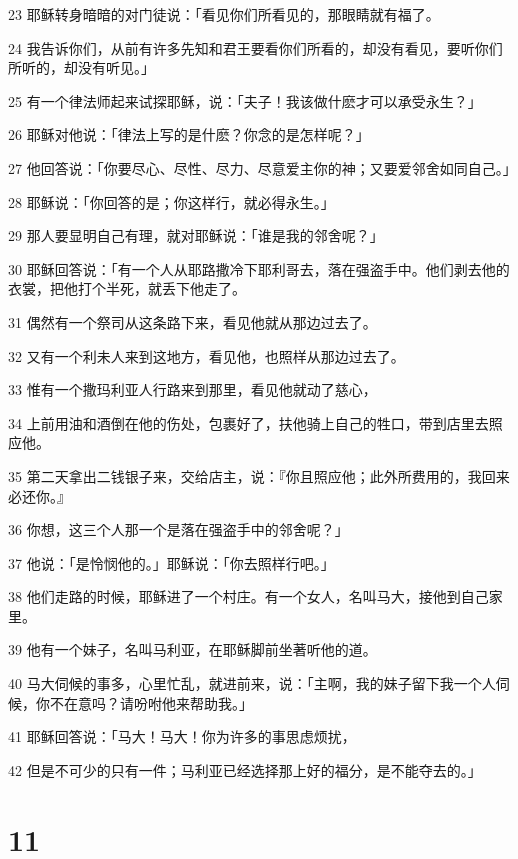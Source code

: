 \par 23 耶稣转身暗暗的对门徒说：「看见你们所看见的，那眼睛就有福了。
\par 24 我告诉你们，从前有许多先知和君王要看你们所看的，却没有看见，要听你们所听的，却没有听见。」
\par 25 有一个律法师起来试探耶稣，说：「夫子！我该做什麽才可以承受永生？」
\par 26 耶稣对他说：「律法上写的是什麽？你念的是怎样呢？」
\par 27 他回答说：「你要尽心、尽性、尽力、尽意爱主你的神；又要爱邻舍如同自己。」
\par 28 耶稣说：「你回答的是；你这样行，就必得永生。」
\par 29 那人要显明自己有理，就对耶稣说：「谁是我的邻舍呢？」
\par 30 耶稣回答说：「有一个人从耶路撒冷下耶利哥去，落在强盗手中。他们剥去他的衣裳，把他打个半死，就丢下他走了。
\par 31 偶然有一个祭司从这条路下来，看见他就从那边过去了。
\par 32 又有一个利未人来到这地方，看见他，也照样从那边过去了。
\par 33 惟有一个撒玛利亚人行路来到那里，看见他就动了慈心，
\par 34 上前用油和酒倒在他的伤处，包裹好了，扶他骑上自己的牲口，带到店里去照应他。
\par 35 第二天拿出二钱银子来，交给店主，说：『你且照应他；此外所费用的，我回来必还你。』
\par 36 你想，这三个人那一个是落在强盗手中的邻舍呢？」
\par 37 他说：「是怜悯他的。」耶稣说：「你去照样行吧。」
\par 38 他们走路的时候，耶稣进了一个村庄。有一个女人，名叫马大，接他到自己家里。
\par 39 他有一个妹子，名叫马利亚，在耶稣脚前坐著听他的道。
\par 40 马大伺候的事多，心里忙乱，就进前来，说：「主啊，我的妹子留下我一个人伺候，你不在意吗？请吩咐他来帮助我。」
\par 41 耶稣回答说：「马大！马大！你为许多的事思虑烦扰，
\par 42 但是不可少的只有一件；马利亚已经选择那上好的福分，是不能夺去的。」

\chapter{11}

